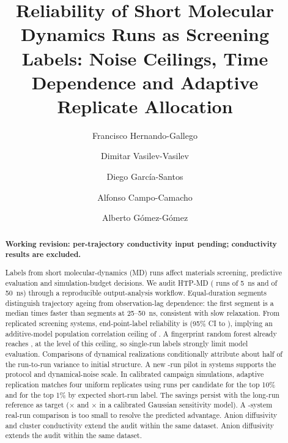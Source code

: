 \documentclass[preprint,12pt]{elsarticle}
\begin{document}
\begin{frontmatter}

\title{Reliability of Short Molecular Dynamics Runs as Screening Labels: Noise Ceilings, Time
Dependence and Adaptive Replicate Allocation}

\author[am]{Francisco Hernando-Gallego}
\author[cs]{Dimitar Vasilev-Vasilev}
\author[cs]{Diego Garc\'ia-Santos}
\author[ind]{Alfonso Campo-Camacho}
\author[ind]{Alberto G\'omez-G\'omez}

\begin{abstract}
\ifconductivityready\else
\textbf{Working revision: per-trajectory conductivity input pending; conductivity results are excluded.}\par
\fi
Labels from short molecular-dynamics (MD) runs affect materials screening, predictive evaluation
and simulation-budget decisions. We audit HTP-MD (\nShort{} runs of \SI{5}{\nano\second} and
\nLong{} of \SI{50}{\nano\second}) through a reproducible output-analysis workflow. Equal-duration
segments distinguish trajectory ageing from observation-lag dependence: the first segment is
a median \segEndFirst{} times faster than segments at 25--\SI{50}{\nano\second}, consistent
with slow relaxation. From \nRep{} replicated screening systems, end-point-label reliability
is \RepEndIcc{} (95\% CI \RepEndIccLo{} to \RepEndIccHi), implying an additive-model
population correlation ceiling of \techoEndCorr{}. A fingerprint random forest already reaches
\mlCorr{}, at the level of this ceiling, so single-run labels strongly limit model evaluation. Comparisons of dynamical realizations
conditionally attribute about half of the run-to-run variance to initial structure. A new
\pilRuns{}-run pilot in \pilN{} systems supports the protocol and dynamical-noise scale.
In calibrated campaign simulations, adaptive replication matches four uniform replicates using
\alEqTopTenUnifFour{} runs per candidate for the top 10\% and \alEqTopOneUnifFour{} for the top
1\% by expected short-run label. The savings persist with the long-run
reference as target ($\times$\olEstTopTenSaving{} and $\times$\olEstTopOneSaving{} in a calibrated
Gaussian sensitivity model). A \valAlNCamp{}-system real-run comparison is too small to resolve
the predicted advantage.
\ifconductivityready Anion diffusivity and cluster conductivity extend the audit within the same dataset.
\else Anion diffusivity extends the audit within the same dataset.\fi
\end{abstract}


\end{frontmatter}
\end{document}
